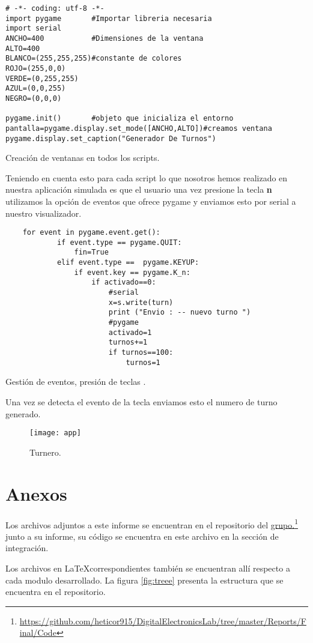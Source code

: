 \documentclass[a4paper]{article}
\newcommand\fnurl[2]{%
\href{#2}{#1}\footnote{\url{#2}}%
}
\begin{document}
\begin{listing}[H]
	\begin{verbatim}
# -*- coding: utf-8 -*-			
import pygame		#Importar libreria necesaria
import serial
ANCHO=400			#Dimensiones de la ventana
ALTO=400	
BLANCO=(255,255,255)#constante de colores
ROJO=(255,0,0)
VERDE=(0,255,255)
AZUL=(0,0,255)
NEGRO=(0,0,0)

pygame.init()		#objeto que inicializa el entorno	
pantalla=pygame.display.set_mode([ANCHO,ALTO])#creamos ventana
pygame.display.set_caption("Generador De Turnos") 
\end{verbatim}
\caption{Creación  de ventanas en todos los scripts.}
    \label{window}
\end{listing}
Teniendo en cuenta esto para cada script lo que nosotros hemos realizado en nuestra aplicación simulada es que el usuario una vez presione la tecla \textbf{n}  utilizamos la opción de eventos que ofrece pygame y enviamos esto por serial a nuestro visualizador. 

\begin{listing}[H]
	\begin{verbatim}
	for event in pygame.event.get():
			if event.type == pygame.QUIT:
				fin=True
			elif event.type ==	pygame.KEYUP:
				if event.key == pygame.K_n:
					if activado==0:
						#serial
						x=s.write(turn)
						print ("Envio : -- nuevo turno ")
						#pygame
						activado=1
						turnos+=1
						if turnos==100:
							turnos=1
\end{verbatim}
\caption{Gestión de eventos, presión de teclas .}
    \label{presion}
\end{listing}
Una vez se detecta el evento de la tecla enviamos esto el numero de turno generado. 

\begin{figure}[H]
  \centering
     \texttt{[image: app]}
  \caption{Turnero.}
    \label{fig:turnero}
\end{figure}

\clearpage
\newpage
\section{Anexos}
Los archivos adjuntos a este informe se encuentran en el repositorio del \fnurl{grupo.}{https://github.com/heticor915/DigitalElectronicsLab/tree/master/Reports/Final/Code} junto a su informe, su código se encuentra en este archivo en la sección de integración. 

Los archivos en  \LaTeX  correspondientes también se encuentran allí respecto a cada modulo desarrollado. La figura \ref{fig:treee} presenta la estructura que se encuentra en el repositorio.
\end{document}
